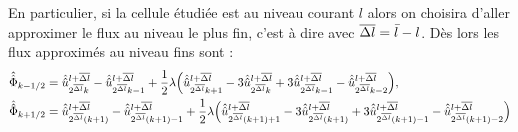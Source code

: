             En particulier, si la cellule étudiée est au niveau courant $l$ alors on choisira d'aller approximer le flux au niveau le plus fin, c'est à dire avec $\overline{\Delta l} = \bar l - l$.
            Dès lors les flux approximés au niveau fins sont : 
            \begin{align}
                \hat{\hat{\Phi}}_{k-1/2} &= \hat{\hat{u}}^{l+\overline{\Delta l}}_{2^{\overline{\Delta l}} k} -  \hat{\hat{u}}^{l+\overline{\Delta l}}_{2^{\overline{\Delta l}} k-1} + \frac{1}{2} \lambda 
                \Bigl(
                    \hat{\hat{u}}^{l+\overline{\Delta l}}_{2^{\overline{\Delta l}} k+1}
                    - 3 \hat{\hat{u}}^{l+\overline{\Delta l}}_{2^{\overline{\Delta l}} k}
                    + 3 \hat{\hat{u}}^{l+\overline{\Delta l}}_{2^{\overline{\Delta l}} k-1}
                    - \hat{\hat{u}}^{l+\overline{\Delta l}}_{2^{\overline{\Delta l}} k-2}
                \Bigr),\\
                \hat{\hat{\Phi}}_{k+1/2} &=  \hat{\hat{u}}^{l+\overline{\Delta l}}_{2^{\overline{\Delta l}} (k+1)} -  \hat{\hat{u}}^{l+\overline{\Delta l}}_{2^{\overline{\Delta l}} (k+1)-1} + \frac{1}{2} \lambda \Bigl(
                    \hat{\hat{u}}^{l+\overline{\Delta l}}_{2^{\overline{\Delta l}} (k+1)+1}
                    - 3 \hat{\hat{u}}^{l+\overline{\Delta l}}_{2^{\overline{\Delta l}} (k+1)}
                    + 3 \hat{\hat{u}}^{l+\overline{\Delta l}}_{2^{\overline{\Delta l}} (k+1)-1}
                    - \hat{\hat{u}}^{l+\overline{\Delta l}}_{2^{\overline{\Delta l}} (k+1)-2}
                \Bigr)
            \end{align}
            
